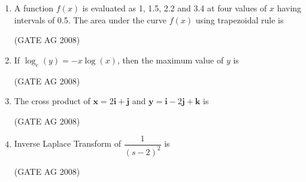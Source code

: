 \documentclass[journal,12pt,onecolumn]{IEEEtran}
\begin{document}
\begin{enumerate}
\medskip

\item 
 A function $f(x)$ is evaluated as 1, 1.5, 2.2 and 3.4 at four values of $x$ having intervals of 0.5. The area under the curve $f(x)$ using trapezoidal rule is 
\begin{enumerate}
 \end{enumerate}
 \hfill(GATE AG 2008)\\

\medskip

\item 
 If $\log_e(y) = -x \log(x)$, then the maximum value of $y$ is 
\begin{enumerate}
\end{enumerate}
\hfill(GATE AG 2008)\\

\medskip

\item 
 The cross product of $\mathbf{x} = 2\mathbf{i}+\mathbf{j}$ and $\mathbf{y} = \mathbf{i}-2\mathbf{j}+\mathbf{k}$ is 
\begin{enumerate}
\end{enumerate}
\hfill(GATE AG 2008)\\

\medskip

\item 
 Inverse Laplace Transform of $\dfrac{1}{(s-2)^2}$ is 
\begin{enumerate}
\end{enumerate}
\hfill(GATE AG 2008)\\


\end{enumerate}
\end{document}
